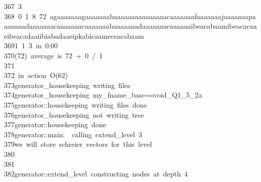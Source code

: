 \begin{tabbing}
367\>\ 3\\[0pt]
368\ 0\ 1\ 8\ 72\ agaaaaaaagaaaaaaabaaaaaaaaaaaaaaacaaaaaaafaaaaaaajaaaaaaapaaaaaaadaaaaaaacaaaaaaacaaaaaaabaaaaaaadaaaaaaacaaaaaaibeacabaamibeacacaaeibeacadaaiibiabadaaeipkabicaameceacabaam\\[0pt]
369\>1\ 1\ 3\ in\ 0:00\\[0pt]
370\>(72)\ average\ is\ 72\ +\ 0\ /\ 1\\[0pt]
371\>\\[0pt]
372\>\ in\ action\ O(62)\\[0pt]
373\>generator\_housekeeping\ writing\ files\\[0pt]
374\>generator\_housekeeping\ my\_fname\_base=ovoid\_Q1\_5\_2a\\[0pt]
375\>generator::housekeeping\ writing\ files\ done\\[0pt]
376\>generator\_housekeeping\ not\ writing\ tree\\[0pt]
377\>generator::housekeeping\ done\\[0pt]
378\>generator::main:\ \ calling\ extend\_level\ 3\\[0pt]
379\>we\ will\ store\ schreier\ vectors\ for\ this\ level\\[0pt]
380\>\\[0pt]
381\>\\[0pt]
382\>generator::extend\_level\ constructing\ nodes\ at\ depth\ 4\\[0pt]

\end{tabbing}
